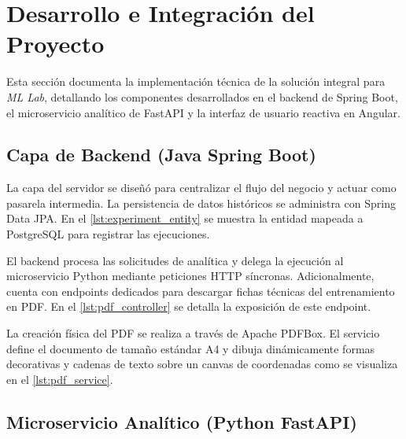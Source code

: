 \section{Desarrollo e Integración del Proyecto}\label{sec:desarrollo}

Esta sección documenta la implementación técnica de la solución integral para \textit{ML Lab}, detallando los componentes desarrollados en el backend de Spring Boot, el microservicio analítico de FastAPI y la interfaz de usuario reactiva en Angular.

\subsection{Capa de Backend (Java Spring Boot)}

La capa del servidor se diseñó para centralizar el flujo del negocio y actuar como pasarela intermedia. La persistencia de datos históricos se administra con Spring Data JPA. En el \autoref{lst:experiment_entity} se muestra la entidad mapeada a PostgreSQL para registrar las ejecuciones.



El backend procesa las solicitudes de analítica y delega la ejecución al microservicio Python mediante peticiones HTTP síncronas. Adicionalmente, cuenta con endpoints dedicados para descargar fichas técnicas del entrenamiento en PDF. En el \autoref{lst:pdf_controller} se detalla la exposición de este endpoint.



La creación física del PDF se realiza a través de Apache PDFBox. El servicio define el documento de tamaño estándar A4 y dibuja dinámicamente formas decorativas y cadenas de texto sobre un canvas de coordenadas como se visualiza en el \autoref{lst:pdf_service}.



\subsection{Microservicio Analítico (Python FastAPI)}

